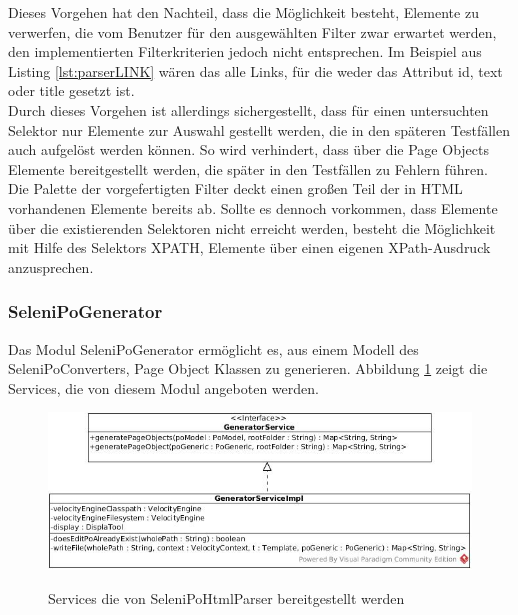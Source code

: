 Dieses Vorgehen hat den Nachteil, dass die Möglichkeit besteht, Elemente zu verwerfen, die vom Benutzer für den ausgewählten Filter zwar erwartet werden, den implementierten Filterkriterien jedoch nicht entsprechen.
Im Beispiel aus Listing \ref{lst:parserLINK} wären das alle Links, für die weder das Attribut id, text oder title gesetzt ist.\\
Durch dieses Vorgehen ist allerdings sichergestellt, dass für einen untersuchten Selektor nur Elemente zur Auswahl gestellt werden, die in den späteren Testfällen auch aufgelöst werden können. So wird verhindert, dass über die Page Objects Elemente bereitgestellt werden, die später in den Testfällen zu Fehlern führen.\\
Die Palette der vorgefertigten Filter deckt einen großen Teil der in HTML vorhandenen Elemente bereits ab. Sollte es dennoch vorkommen, dass Elemente über die existierenden Selektoren nicht erreicht werden, besteht die Möglichkeit mit Hilfe des Selektors XPATH, Elemente über einen eigenen XPath-Ausdruck anzusprechen.



\subsubsection{SeleniPoGenerator}
\label{sec:selenipogenerator}
Das Modul SeleniPoGenerator ermöglicht es, aus einem Modell des SeleniPoConverters, Page Object Klassen zu generieren.
Abbildung \ref{fig:generator_service} zeigt die Services, die von diesem Modul angeboten werden.

\begin{figure}[htb]
  \centering  
  \includegraphics[scale=0.5]{img/SelenipoGenerator.jpg}\\
  \caption{Services die von SeleniPoHtmlParser bereitgestellt werden}
  \label{fig:generator_service}
\end{figure}


